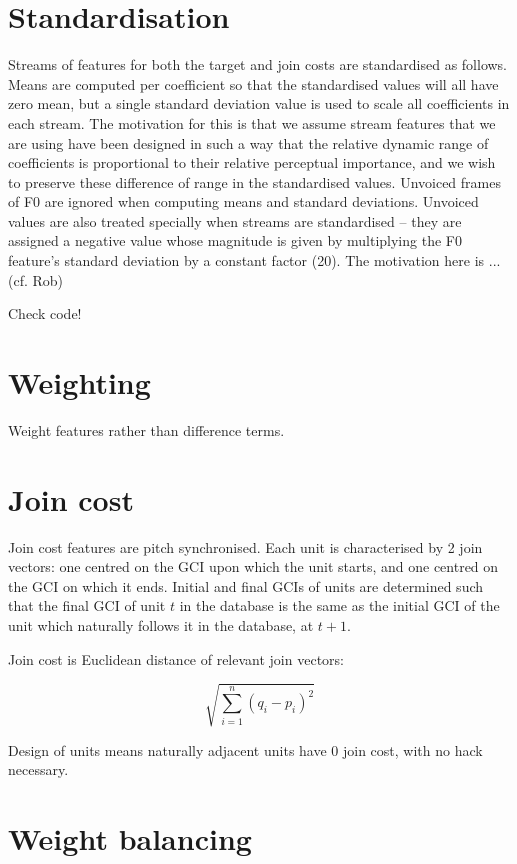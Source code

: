 \section{Standardisation}

Streams of features for both the target and join costs are standardised as follows. Means are computed per coefficient so that the standardised values will all have zero mean, but a single standard deviation value is used to scale all coefficients in each stream. The motivation for this is that we assume stream features that we are using have been designed in such a way that the relative dynamic range of coefficients is proportional to their relative perceptual importance, and we wish to preserve these difference of range in the standardised values. Unvoiced frames of F0 are ignored when computing means and standard deviations. Unvoiced values are also treated specially when streams are standardised -- they are assigned a negative value whose magnitude is given by multiplying the F0 feature's standard deviation by a constant factor (20). The motivation here is ... (cf. Rob)

Check code!

\section{Weighting}
Weight features rather than difference terms.


\section{Join cost}

Join cost features are pitch synchronised. Each unit is characterised by 2 join vectors: one centred on the GCI upon which the unit starts, and one centred on the GCI on which it ends. Initial and final GCIs of units are determined such that the final GCI of unit $t$ in the database is the same as the initial GCI of the unit which naturally follows it in the database, at $t+1$.

Join cost is Euclidean distance of relevant join vectors:

\begin{equation}
\sqrt{\sum_{i=1}^{n}(q_i - p_i)^{2}}
\end{equation}

Design of units means naturally adjacent units have 0 join cost, with no hack necessary.




\section{Weight balancing}

